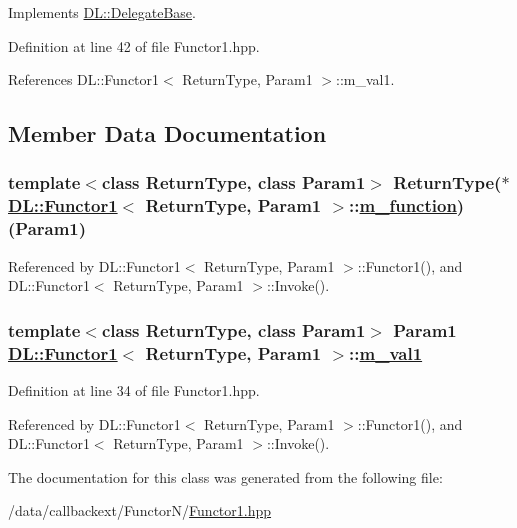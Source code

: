 Implements \hyperlink{classDL_1_1DelegateBase_a2}{DL::Delegate\-Base}.

Definition at line 42 of file Functor1.hpp.

References DL::Functor1$<$ Return\-Type, Param1 $>$::m\_\-val1.

\subsection{Member Data Documentation}
\hypertarget{classDL_1_1Functor1_r0}{
\subsubsection[m\_\-function]{\setlength{\rightskip}{0pt plus 5cm}template$<$class Return\-Type, class Param1$>$ Return\-Type($\ast$ \hyperlink{classDL_1_1Functor1}{DL::Functor1}$<$ Return\-Type, Param1 $>$::\hyperlink{classDL_1_1Functor1_r0}{m\_\-function})(Param1)}}
\label{classDL_1_1Functor1_r0}




Referenced by DL::Functor1$<$ Return\-Type, Param1 $>$::Functor1(), and DL::Functor1$<$ Return\-Type, Param1 $>$::Invoke().\hypertarget{classDL_1_1Functor1_r1}{
\subsubsection[m\_\-val1]{\setlength{\rightskip}{0pt plus 5cm}template$<$class Return\-Type, class Param1$>$ Param1 \hyperlink{classDL_1_1Functor1}{DL::Functor1}$<$ Return\-Type, Param1 $>$::\hyperlink{classDL_1_1Functor1_r1}{m\_\-val1}}}
\label{classDL_1_1Functor1_r1}




Definition at line 34 of file Functor1.hpp.

Referenced by DL::Functor1$<$ Return\-Type, Param1 $>$::Functor1(), and DL::Functor1$<$ Return\-Type, Param1 $>$::Invoke().

The documentation for this class was generated from the following file:\begin{CompactItemize}
\item 
/data/callbackext/Functor\-N/\hyperlink{Functor1_8hpp}{Functor1.hpp}\end{CompactItemize}
